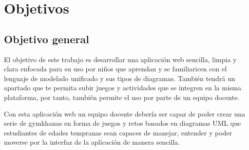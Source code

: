 \documentclass[a4paper, 12pt]{book}
\begin{document}
\cleardoublepage %
\chapter{Objetivos} %
\label{chap:objetivos} %


\section{Objetivo general} %
\label{sec:objetivo-general} %

El objetivo de este trabajo es desarrollar una aplicación web sencilla, limpia y clara enfocada para su uso por niños que aprendan y se familiaricen con el lenguaje de modelado unificado y sus tipos de diagramas. También tendrá un apartado que te permita subir juegos y actividades que se integren en la misma plataforma, por tanto, también permite el uso por parte de un equipo docente.

Con esta aplicación web un equipo docente debería ser capaz de poder crear una serie de gymkhanas en forma de juegos y retos basados en diagramas UML que estudiantes de edades tempranas sean capaces de manejar, entender y poder moverse por la interfaz de la aplicación de manera sencilla. 
\end{document}
